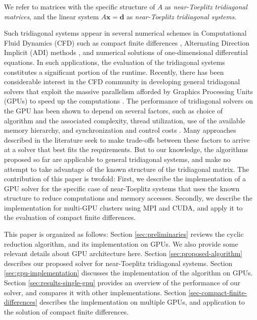 \documentclass{elsarticle}
\begin{document}
We refer to matrices with the specific structure of $A$
as \emph{near-Toeplitz tridiagonal matrices},
and the linear system $A\bm{x}=\bm{d}$ as \emph{near-Toeplitz tridiagonal systems}.

Such tridiagonal systems
appear in several numerical schemes
in Computational Fluid Dynamics (CFD)
such as
compact finite differences
\cite{lele1992compact,kennedy1994several},
Alternating Direction Implicit (ADI) methods \cite{1955ADI}, and
numerical solutions of one-dimensional differential equations.
In such applications,
the evaluation of the tridiagonal systems constitutes
a significant portion of the runtime.
Recently, there has been considerable interest in the CFD community
in developing general tridiagonal solvers that
exploit the massive parallelism afforded by
Graphics Processing Units (GPUs)
to speed up the computations
\cite{tutkun2012gpu,esfahanian2014efficient,GoSt11CR}.
The performance of tridiagonal solvers on the GPU
has been shown to depend on several factors,
such as
choice of algorithm and the associated complexity,
thread utilization,
use of the available memory hierarchy,
and synchronization and control costs
\cite{Zhang2010FTS}.
Many approaches described in the literature
seek to make trade-offs between these factors
to arrive at a solver that best fits the requirements.
But to our knowledge,
the algorithms proposed so far
are applicable to general tridiagonal systems,
and make no attempt to take advantage of
the known structure of the tridiagonal matrix.
The contribution of this paper is twofold:
First, we describe the implementation of a GPU solver
for the specific case of near-Toeplitz systems
that uses the known structure to reduce
computations and memory accesses.
Secondly, we describe the implementation for
multi-GPU clusters using MPI and CUDA,
and apply it to the evaluation of compact finite differences.

This paper is organized as follows:
Section \ref{sec:preliminaries}
reviews the cyclic reduction algorithm,
and its implementation on GPUs.
We also provide some relevant details about GPU architecture here.
Section \ref{sec:proposed-algorithm}
describes our proposed solver for near-Toeplitz tridiagonal systems.
Section \ref{sec:gpu-implementation}
discusses the implementation of the algorithm on GPUs.
Section \ref{sec:results-single-gpu}
provides an overview of the performance of our solver,
and compares it with other implementations.
Section \ref{sec-compact-finite-differences}
describes the implementation on multiple GPUs,
and application to the solution of compact finite differences.
\end{document}
